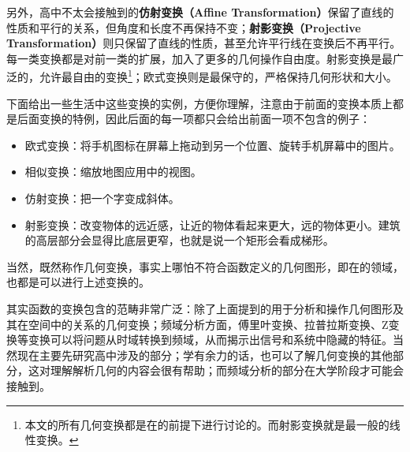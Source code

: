 另外，高中不太会接触到的\textbf{仿射变换（Affine Transformation）}保留了直线的性质和平行的关系，但角度和长度不再保持不变；\textbf{射影变换（Projective Transformation）}则只保留了直线的性质，甚至允许平行线在变换后不再平行。每一类变换都是对前一类的扩展，加入了更多的几何操作自由度。射影变换是最广泛的，允许最自由的变换\footnote{本文的所有几何变换都是在的前提下进行讨论的。而射影变换就是最一般的线性变换。}；欧式变换则是最保守的，严格保持几何形状和大小。

下面给出一些生活中这些变换的实例，方便你理解，注意由于前面的变换本质上都是后面变换的特例，因此后面的每一项都只会给出前面一项不包含的例子：

\begin{itemize}
\item 欧式变换：将手机图标在屏幕上拖动到另一个位置、旋转手机屏幕中的图片。
\item 相似变换：缩放地图应用中的视图。
\item 仿射变换：把一个字变成斜体。
\item 射影变换：改变物体的远近感，让近的物体看起来更大，远的物体更小。建筑的高层部分会显得比底层更窄，也就是说一个矩形会看成梯形。
\end{itemize}

当然，既然称作几何变换，事实上哪怕不符合函数定义的几何图形，即在的领域，也都是可以进行上述变换的。

其实函数的变换包含的范畴非常广泛：除了上面提到的用于分析和操作几何图形及其在空间中的关系的几何变换；频域分析方面，傅里叶变换、拉普拉斯变换、Z变换等变换可以将问题从时域转换到频域，从而揭示出信号和系统中隐藏的特征。当然现在主要先研究高中涉及的部分；学有余力的话，也可以了解几何变换的其他部分，这对理解解析几何的内容会很有帮助；而频域分析的部分在大学阶段才可能会接触到。
